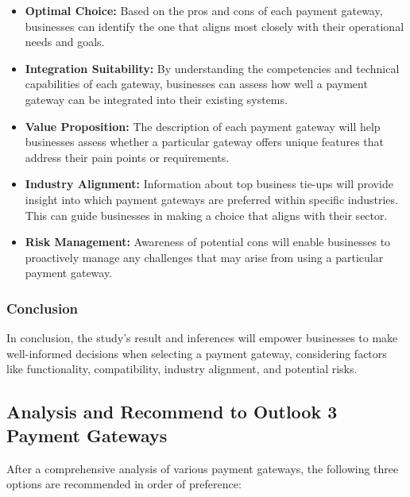\begin{itemize}
    \item \textbf{Optimal Choice:} Based on the pros and cons of each payment gateway, businesses can identify the one that aligns most closely with their operational needs and goals.
    
    \item \textbf{Integration Suitability:} By understanding the competencies and technical capabilities of each gateway, businesses can assess how well a payment gateway can be integrated into their existing systems.
    
    \item \textbf{Value Proposition:} The description of each payment gateway will help businesses assess whether a particular gateway offers unique features that address their pain points or requirements.
    
    \item \textbf{Industry Alignment:} Information about top business tie-ups will provide insight into which payment gateways are preferred within specific industries. This can guide businesses in making a choice that aligns with their sector.
    
    \item \textbf{Risk Management:} Awareness of potential cons will enable businesses to proactively manage any challenges that may arise from using a particular payment gateway.
\end{itemize}
\subsubsection{Conclusion}
In conclusion, the study's result and inferences will empower businesses to make well-informed decisions when selecting a payment gateway, considering factors like functionality, compatibility, industry alignment, and potential risks.

\subsection{Analysis and Recommend to Outlook 3 Payment Gateways}
After a comprehensive analysis of various payment gateways, the following three options are recommended in order of preference:


